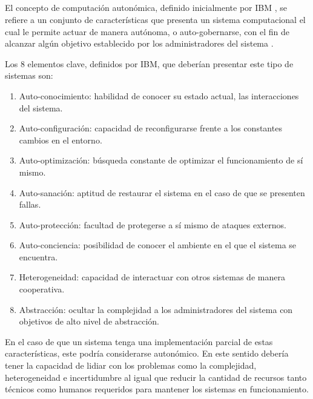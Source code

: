 \documentclass[12pt]{article}
\begin{document}
\subsection{}


El concepto de computación autonómica, definido inicialmente por IBM \citeyear{horn_2001}, se refiere a un conjunto de características que presenta un sistema computacional el cual le permite actuar de manera autónoma, o auto-gobernarse, con el fin de alcanzar algún objetivo establecido por los administradores del sistema \cite{lalanda_diaconescu_mccann_2014}.


Los 8 elementos clave, definidos por IBM, que deberían presentar este tipo de sistemas son:
\begin{enumerate}
	\item Auto-conocimiento: habilidad de conocer su estado actual, las interacciones del sistema.
	\item Auto-configuración: capacidad de reconfigurarse frente a los constantes cambios en el entorno.
	\item Auto-optimización: búsqueda constante de optimizar el funcionamiento de sí mismo.
	\item Auto-sanación: aptitud de restaurar el sistema en el caso de que se presenten fallas.
	\item Auto-protección: facultad de protegerse a sí mismo de ataques externos.
	\item Auto-conciencia: posibilidad de conocer el ambiente en el que el sistema se encuentra.
	\item Heterogeneidad: capacidad de interactuar con otros sistemas de manera cooperativa.
	\item Abstracción: ocultar la complejidad a los administradores del sistema con objetivos de alto nivel de abstracción.
\end{enumerate}

En el caso de que un sistema tenga una implementación parcial de estas características, este podría considerarse autonómico. En este sentido debería tener la capacidad de lidiar con los problemas como la complejidad, heterogeneidad e incertidumbre \cite{emerging_2005} al igual que reducir la cantidad de recursos tanto técnicos como humanos requeridos para mantener los sistemas en funcionamiento.
\end{document}
